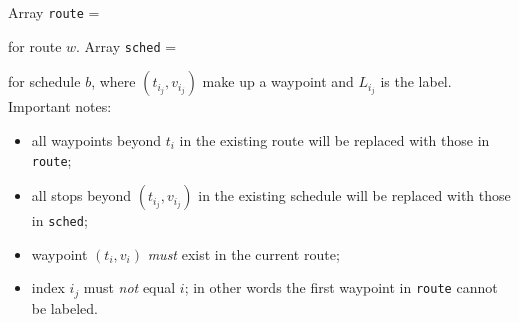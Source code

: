 \documentclass{article}
\theoremstyle{definition}                   %
\begin{document}
Array {\tt{}route} =

\noindent
{}

\noindent for route $w$. Array {\tt{}sched} =

\noindent
{}

\noindent for schedule $b$, where $(t_{i_j},v_{i_j})$ make up a waypoint and
$L_{i_j}$ is the label. Important notes:
\begin{itemize}
\item all waypoints beyond $t_i$ in the existing route will be replaced with
those in {\tt{}route};
\item all stops beyond $(t_{i_j},v_{i_j})$ in the existing schedule will be
replaced with those in {\tt{}sched};
\item waypoint $(t_i,v_i)$ \emph{must} exist in the current route;
\item index $i_j$ must \emph{not} equal $i$; in other words the first waypoint
in {\tt{}route} cannot be labeled.
\end{itemize}
\end{document}
